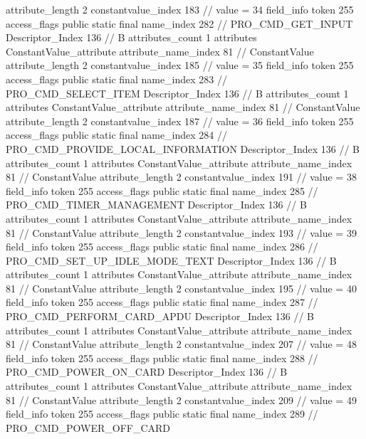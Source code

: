 {{{{{{{					attribute_length	2
					constantvalue_index	183		// value = 34
				}
				}
			}
			field_info {
				token	255
				access_flags	public static final
				name_index	282		// PRO_CMD_GET_INPUT
				Descriptor_Index	136		// B
				attributes_count	1
				attributes {
				ConstantValue_attribute {
					attribute_name_index	81		// ConstantValue
					attribute_length	2
					constantvalue_index	185		// value = 35
				}
				}
			}
			field_info {
				token	255
				access_flags	public static final
				name_index	283		// PRO_CMD_SELECT_ITEM
				Descriptor_Index	136		// B
				attributes_count	1
				attributes {
				ConstantValue_attribute {
					attribute_name_index	81		// ConstantValue
					attribute_length	2
					constantvalue_index	187		// value = 36
				}
				}
			}
			field_info {
				token	255
				access_flags	public static final
				name_index	284		// PRO_CMD_PROVIDE_LOCAL_INFORMATION
				Descriptor_Index	136		// B
				attributes_count	1
				attributes {
				ConstantValue_attribute {
					attribute_name_index	81		// ConstantValue
					attribute_length	2
					constantvalue_index	191		// value = 38
				}
				}
			}
			field_info {
				token	255
				access_flags	public static final
				name_index	285		// PRO_CMD_TIMER_MANAGEMENT
				Descriptor_Index	136		// B
				attributes_count	1
				attributes {
				ConstantValue_attribute {
					attribute_name_index	81		// ConstantValue
					attribute_length	2
					constantvalue_index	193		// value = 39
				}
				}
			}
			field_info {
				token	255
				access_flags	public static final
				name_index	286		// PRO_CMD_SET_UP_IDLE_MODE_TEXT
				Descriptor_Index	136		// B
				attributes_count	1
				attributes {
				ConstantValue_attribute {
					attribute_name_index	81		// ConstantValue
					attribute_length	2
					constantvalue_index	195		// value = 40
				}
				}
			}
			field_info {
				token	255
				access_flags	public static final
				name_index	287		// PRO_CMD_PERFORM_CARD_APDU
				Descriptor_Index	136		// B
				attributes_count	1
				attributes {
				ConstantValue_attribute {
					attribute_name_index	81		// ConstantValue
					attribute_length	2
					constantvalue_index	207		// value = 48
				}
				}
			}
			field_info {
				token	255
				access_flags	public static final
				name_index	288		// PRO_CMD_POWER_ON_CARD
				Descriptor_Index	136		// B
				attributes_count	1
				attributes {
				ConstantValue_attribute {
					attribute_name_index	81		// ConstantValue
					attribute_length	2
					constantvalue_index	209		// value = 49
				}
				}
			}
			field_info {
				token	255
				access_flags	public static final
				name_index	289		// PRO_CMD_POWER_OFF_CARD
}}}}}
